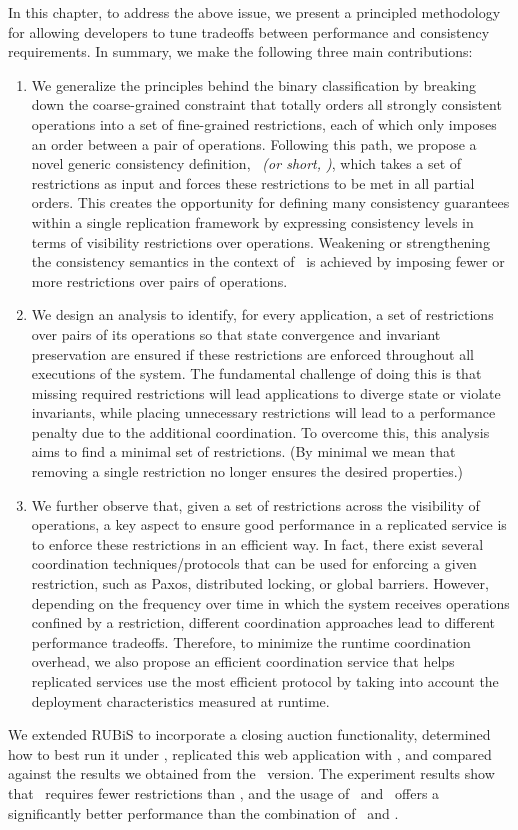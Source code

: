 In this chapter, to address the above issue, we present a principled
methodology for allowing developers to tune tradeoffs between
performance and consistency requirements. 
In summary, we make the following three main contributions:
\begin{enumerate}
\item We generalize the principles
behind the binary classification by breaking down
the coarse-grained constraint that totally orders all strongly consistent operations
into a set of fine-grained restrictions, each of which only imposes an order between 
a pair of operations. Following this path, we propose a novel generic consistency definition, 
{\it \PRCNF\ (or short, \PRCN)}, which takes a set of restrictions
as input and forces these restrictions to be met in all partial orders. This creates the opportunity for defining many consistency 
guarantees within a single replication framework by expressing consistency levels in terms of visibility 
restrictions over operations. Weakening or strengthening the consistency semantics in the 
context of \PRCN\ is achieved by imposing fewer or
more restrictions over pairs of operations. 

\item We design an analysis to identify, for every application, a set of
restrictions over pairs of its operations so that state convergence and
invariant preservation are ensured if these restrictions are enforced throughout all
executions of the system. The fundamental challenge of doing this
is that missing required restrictions will lead applications to diverge state or violate invariants, while
placing unnecessary restrictions will lead to a performance penalty due to the additional coordination. To overcome
this, this analysis aims to find a minimal set of restrictions. (By minimal
we mean that removing a single restriction no longer ensures the desired properties.)

\item We further observe that, given a set of restrictions across the visibility of operations, a 
key aspect to ensure good performance in a replicated service is to enforce these restrictions in an
efficient way. In fact, there exist several coordination techniques/protocols that can be used
for enforcing a given restriction, such as Paxos, distributed locking, or global barriers. However, depending on the
frequency over time in which the system receives operations confined by a restriction, 
different coordination approaches lead to different performance tradeoffs. 
Therefore, to minimize the runtime coordination overhead, we also propose
an efficient coordination service that helps replicated services
use the most efficient protocol by taking into account the deployment characteristics measured at runtime.
\end{enumerate}

We extended RUBiS to incorporate a closing auction functionality, determined how to best run it under \PRCN, replicated this web application with \coordtool, and compared against the results
we obtained from the \RBCAJ\ version. The experiment results show that \PRCN\ requires fewer restrictions
than \RBCN, and the usage of \PRCN\ and \coordtool\ offers a significantly better performance than the combination
of \RBCN\ and \Gemini.
